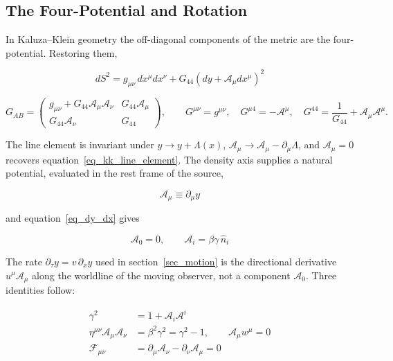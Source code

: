 \documentclass[anonymous]{iopjournal}
\begin{document}
\subsection{The Four-Potential and Rotation}\label{sec_four_potential}

In Kaluza--Klein geometry the off-diagonal components of the metric are the four-potential. Restoring them,

\begin{equation}\label{eq_kk_full}
    dS^2
    =
    g_{\mu\nu}\,dx^\mu dx^\nu
    +
    G_{44}\left(dy+\mathcal{A}_\mu dx^\mu\right)^2
\end{equation}

\begin{equation}\label{eq_kk_full_matrix}
    G_{AB}=\begin{pmatrix}
        g_{\mu\nu}+G_{44}\mathcal{A}_\mu\mathcal{A}_\nu & G_{44}\mathcal{A}_\mu\\
        G_{44}\mathcal{A}_\nu & G_{44}
    \end{pmatrix},
    \qquad
    G^{\mu\nu}=g^{\mu\nu},\quad
    G^{\mu 4}=-\mathcal{A}^{\mu},\quad
    G^{44}=\frac{1}{G_{44}}+\mathcal{A}_\mu\mathcal{A}^\mu .
\end{equation}

The line element is invariant under $y\to y+\Lambda(x)$, $\mathcal{A}_\mu\to\mathcal{A}_\mu-\partial_\mu\Lambda$, and $\mathcal{A}_\mu=0$ recovers equation~\eqref{eq_kk_line_element}. The density axis supplies a natural potential, evaluated in the rest frame of the source,

\begin{equation}\label{eq_potential_definition}
    \mathcal{A}_\mu \equiv \partial_\mu y
\end{equation}

and equation~\eqref{eq_dy_dx} gives

\begin{equation}\label{eq_potential_components}
    \mathcal{A}_0 = 0,
    \qquad
    \mathcal{A}_i = \beta\gamma\,\hat{n}_i
\end{equation}

The rate $\partial_\tau y=v\,\partial_x y$ used in section~\ref{sec_motion} is the directional derivative $u^\mu\mathcal{A}_\mu$ along the worldline of the moving observer, not a component $\mathcal{A}_0$. Three identities follow:

\begin{align}
    \gamma^2 &= 1+\mathcal{A}_i\mathcal{A}^i
    \label{eq_gamma_from_potential}\\
    \eta^{\mu\nu}\mathcal{A}_\mu\mathcal{A}_\nu
    &= \beta^2\gamma^2 = \gamma^2-1,
    \qquad
    \mathcal{A}_\mu w^\mu = 0
    \label{eq_potential_norm}\\
    \mathcal{F}_{\mu\nu} &= \partial_\mu\mathcal{A}_\nu-\partial_\nu\mathcal{A}_\mu = 0
    \label{eq_potential_field_strength}
\end{align}
\end{document}
